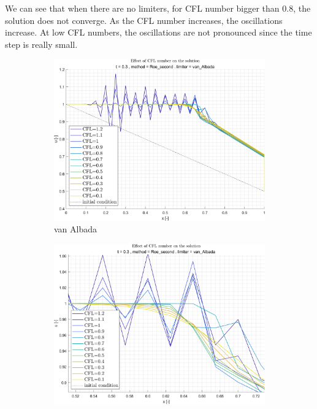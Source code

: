 \documentclass[11pt, a4paper]{article}
\begin{document}
\noindent We can see that when there are no limiters, for CFL number bigger than 0.8, the solution does not converge. As the CFL number increases, the oscillations increase. At low CFL numbers, the oscillations are not pronounced since the time step is really small.
\begin{figure}[H]
    \centering
    \begin{subfigure}[c]{.35\textwidth}
        \centering
        \includegraphics[width=\textwidth]{images/grap3.png}
        \caption{van Albada}
        \label{fig:roe_second_van_Albada_A}
    \end{subfigure}
    \begin{subfigure}[c]{.35\textwidth}
        \centering
        \includegraphics[width=\textwidth]{images/grap3.1.png}

\end{subfigure}
\end{figure}
\end{document}
